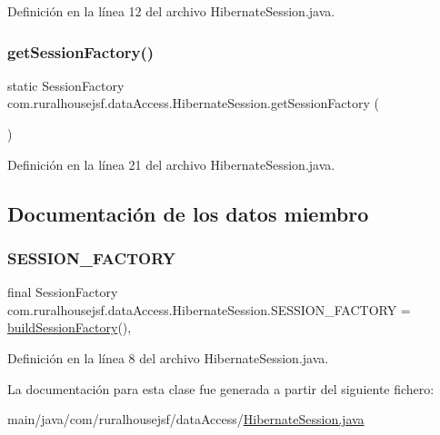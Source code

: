 Definición en la línea 12 del archivo Hibernate\+Session.\+java.

\mbox{\label{classcom_1_1ruralhousejsf_1_1data_access_1_1_hibernate_session_ac3420369289a3eb4051f880815d4b5c1}} 
\subsubsection{\texorpdfstring{getSessionFactory()}{getSessionFactory()}}
{\footnotesize\ttfamily static Session\+Factory com.\+ruralhousejsf.\+data\+Access.\+Hibernate\+Session.\+get\+Session\+Factory (\begin{DoxyParamCaption}{ }\end{DoxyParamCaption})\hspace{0.3cm}{\ttfamily [static]}}



Definición en la línea 21 del archivo Hibernate\+Session.\+java.



\subsection{Documentación de los datos miembro}
\mbox{\label{classcom_1_1ruralhousejsf_1_1data_access_1_1_hibernate_session_abb795a9ae4989d1caa92621d53529fe1}} 
\subsubsection{\texorpdfstring{SESSION\_FACTORY}{SESSION\_FACTORY}}
{\footnotesize\ttfamily final Session\+Factory com.\+ruralhousejsf.\+data\+Access.\+Hibernate\+Session.\+S\+E\+S\+S\+I\+O\+N\+\_\+\+F\+A\+C\+T\+O\+RY = \mbox{\hyperlink{classcom_1_1ruralhousejsf_1_1data_access_1_1_hibernate_session_a54c628cf25032f8511a199671e73820d}{build\+Session\+Factory}}()\hspace{0.3cm}{\ttfamily [static]}, {\ttfamily [private]}}



Definición en la línea 8 del archivo Hibernate\+Session.\+java.



La documentación para esta clase fue generada a partir del siguiente fichero\+:\begin{DoxyCompactItemize}
\item 
main/java/com/ruralhousejsf/data\+Access/\mbox{\hyperlink{_hibernate_session_8java}{Hibernate\+Session.\+java}}\end{DoxyCompactItemize}
